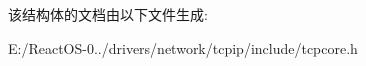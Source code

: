 \begin{DoxyCompactItemize}
\begin{tabbing}
\end{tabbing}\end{DoxyCompactItemize}


该结构体的文档由以下文件生成\+:\begin{DoxyCompactItemize}
\item 
E\+:/\+React\+O\+S-\/0../drivers/network/tcpip/include/tcpcore.\+h\end{DoxyCompactItemize}

